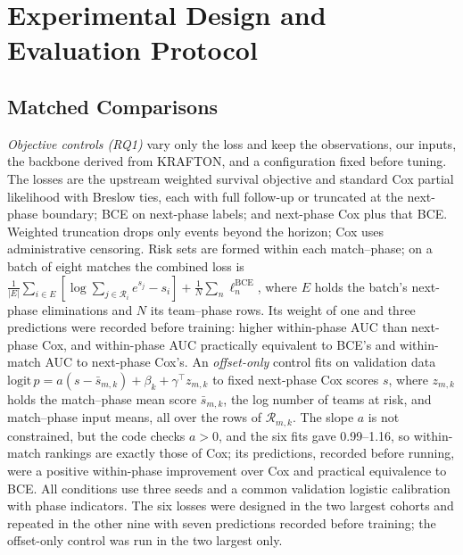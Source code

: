 \documentclass[sigconf,anonymous,nonacm]{acmart}
\begin{document}
\section{Experimental Design and Evaluation Protocol}
\label{sec:method:evaluation}
\subsection{Matched Comparisons}
\label{sec:method:decomposition}
\emph{Objective controls (RQ1)} vary only the loss and keep the observations, our inputs, the backbone derived from KRAFTON, and a configuration fixed before tuning. The losses are the upstream weighted survival objective and standard Cox partial likelihood with Breslow ties, each with full follow-up or truncated at the next-phase boundary; BCE on next-phase labels; and next-phase Cox plus that BCE. Weighted truncation drops only events beyond the horizon; Cox uses administrative censoring. Risk sets are formed within each match--phase; on a batch of eight matches the combined loss is $\frac{1}{|E|}\sum_{i\in E}[\log\sum_{j\in\mathcal{R}_i}e^{s_j}-s_i]+\frac{1}{N}\sum_{n}\ell^{\mathrm{BCE}}_n$, where $E$ holds the batch's next-phase eliminations and $N$ its team--phase rows. Its weight of one and three predictions were recorded before training: higher within-phase AUC than next-phase Cox, and within-phase AUC practically equivalent to BCE's and within-match AUC to next-phase Cox's. An \emph{offset-only} control fits on validation data $\mathrm{logit}\,p=a(s-\bar s_{m,k})+\beta_k+\gamma^{\top}z_{m,k}$ to fixed next-phase Cox scores $s$, where $z_{m,k}$ holds the match--phase mean score $\bar s_{m,k}$, the log number of teams at risk, and match--phase input means, all over the rows of $\mathcal{R}_{m,k}$. The slope $a$ is not constrained, but the code checks $a>0$, and the six fits gave 0.99--1.16, so within-match rankings are exactly those of Cox; its predictions, recorded before running, were a positive within-phase improvement over Cox and practical equivalence to BCE. All conditions use three seeds and a common validation logistic calibration with phase indicators. The six losses were designed in the two largest cohorts and repeated in the other nine with seven predictions recorded before training; the offset-only control was run in the two largest only.
\end{document}
